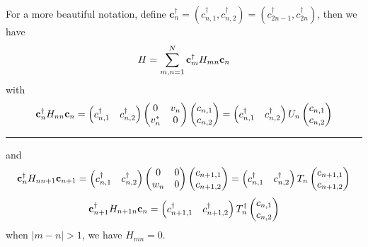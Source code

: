 \documentclass[letterpaper,10pt,english]{sphinxmanual}
\begin{document}
For a more beautiful notation, define
\(\mathbf{c}_n^\dagger=(c_{n,1}^\dagger,c_{n,2}^\dagger)=(c_{2n-1}^\dagger,c_{2n}^\dagger)\),
then we have
\begin{gather}
\begin{split}H=\sum_{m,n=1}^N \mathbf{c}_m^\dagger H_{mn}\mathbf{c}_n\end{split}\notag
\end{gather}
with
\begin{gather}
\begin{split}\mathbf{c}_n^\dagger H_{nn}\mathbf{c}_n=\begin{pmatrix}c_{n,1}^\dagger&c_{n,2}^\dagger\end{pmatrix}\begin{pmatrix}0&v_n\\v_n^*&0\end{pmatrix}\begin{pmatrix}c_{n,1}\\c_{n,2}\end{pmatrix}=\begin{pmatrix}c_{n,1}^\dagger&c_{n,2}^\dagger\end{pmatrix}U_n\begin{pmatrix}c_{n,1}\\c_{n,2}\end{pmatrix}\end{split}\notag
\end{gather}

\bigskip\hrule{}\bigskip


and
\begin{gather}
\begin{split}\mathbf{c}_n^\dagger H_{nn+1}\mathbf{c}_{n+1}=\begin{pmatrix}c_{n,1}^\dagger&c_{n,2}^\dagger\end{pmatrix}\begin{pmatrix}0&0\\w_n&0\end{pmatrix}\begin{pmatrix}c_{n+1,1}\\c_{n+1,2}\end{pmatrix}=\begin{pmatrix}c_{n,1}^\dagger&c_{n,2}^\dagger\end{pmatrix}T_n\begin{pmatrix}c_{n+1,1}\\c_{n+1,2}\end{pmatrix}\end{split}\notag
\end{gather}\begin{gather}
\begin{split}\mathbf{c}_{n+1}^\dagger H_{n+1n}\mathbf{c}_{n}=\begin{pmatrix}c_{n+1,1}^\dagger&c_{n+1,2}^\dagger\end{pmatrix}T_n^\dagger\begin{pmatrix}c_{n,1}\\c_{n,2}\end{pmatrix}\end{split}\notag
\end{gather}
when \(|m-n|>1\), we have \(H_{mn}=0\).
\end{document}
